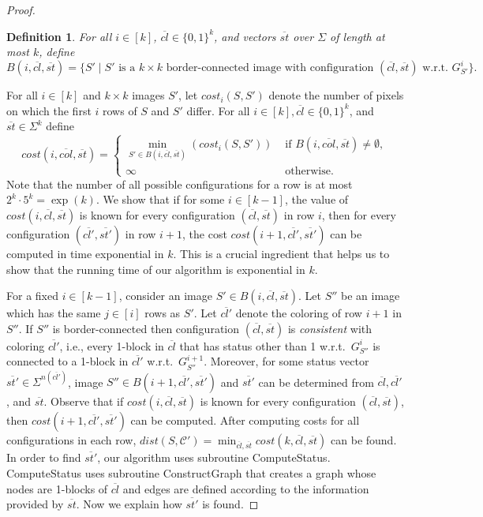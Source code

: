 \documentclass[11pt,english]{article}
\newtheorem{definition}{Definition}[section]
\numberwithin{figure}{section}
\newcommand{\C}{{\mathcal C}}
\newcommand{\dis}{dist}
\newcommand{\Compst}{{\sf ComputeStatus}\xspace}
\newcommand{\Constgr}{{\sf ConstructGraph}\xspace}
\begin{document}
\begin{proof}
{\begin{definition}\label{def:bc-sets}
For all $i\in[k]$, $\overline{cl}\in\{0,1\}^k$, and vectors $\overline{st}$ over $\Sigma$ of length at most $k$, define $B(i,\overline{cl},\overline{st})=\{S'\mid S' \text{ is a }k\times k \text{ border-connected image with configuration }(\overline{cl},\overline{st}) \text{ w.r.t.\ } G^i_{S'}\}.$
\end{definition}

For all $i\in[k]$ and $k\times k$ images $S'$, let $cost_i(S,S')$ denote the number of pixels on which the first $i$ rows of $S$ and $S'$ differ. For all $i\in[k], \overline{cl}\in\{0,1\}^k$, and $\overline{st}\in\Sigma^k$ define
$$
{cost}(i,\overline{col},\overline{st})=
\begin{cases}
\min_{S'\in B(i,\overline{cl},\overline{st})}(cost_i(S,S')) & \text{ if } B(i,\overline{col},\overline{st})\neq\emptyset,\\
\infty & \text{ otherwise.}
\end{cases}
$$
Note that the number of all possible configurations for a row is at most $2^k\cdot 5^k=\exp(k)$. We show that if for some $i\in[k-1]$, the value of ${cost}(i,\overline{cl},\overline{st})$ is known for every configuration $(\overline{cl},\overline{st})$ in row $i$, then for every configuration $(\overline{cl'},\overline{st'})$ in row $i+1$, the cost ${cost}(i+1,\overline{cl'},\overline{st'})$ can be computed in time exponential in $k$. This is a crucial ingredient that helps us to show that the running time of our algorithm is exponential in $k$.

For a fixed $i\in[k-1]$, consider an image $S'\in B(i,\overline{cl},\overline{st})$. Let $S''$ be an image which has the same $j\in[i]$ rows as $S'$. Let $\overline{cl'}$ denote the coloring of row $i+1$ in $S''$. If $S''$ is border-connected then configuration $(\overline{cl},\overline{st})$ is {\em consistent} with coloring $\overline{cl'}$, i.e., every 1-block in $\overline{cl}$ that has status other than 1 w.r.t.\ $G^{i}_{S''}$ is connected to a 1-block in $\overline{cl'}$ w.r.t.\ $G^{i+1}_{S''}$. Moreover, for some status vector $\overline{st'}\in\Sigma^{n(\overline{cl'})}$, image $S''\in B(i+1,\overline{cl'},\overline{st'})$ and $\overline{st'}$ can be determined from $\overline{cl},\overline{cl'}$, and $\overline{st}$. Observe that if ${cost}(i,\overline{cl},\overline{st})$ is known for every configuration $(\overline{cl},\overline{st})$, then $cost(i+1,\overline{cl'},\overline{st'})$ can be computed. After computing costs for all configurations in each row, $\dis(S,\C')=\min_{\overline{cl},\overline{st}}cost(k,\overline{cl},\overline{st})$ can be found. In order to find $\overline{st'}$, our algorithm uses subroutine \Compst. \Compst uses subroutine \Constgr that creates a graph whose nodes are 1-blocks of $\overline{cl}$ and edges are defined according to the information provided by $\overline{st}$. Now we explain how $\overline{st'}$ is found. }




\end{proof}
\end{document}
